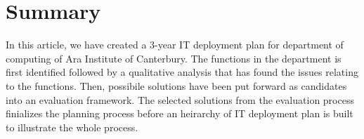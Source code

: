 
\section{Summary}

In this article, we have created a 3-year IT deployment plan for department of computing of Ara Institute of Canterbury. The functions in the department is first identified followed by a qualitative analysis that has found the issues relating to the functions. Then, possibile solutions have been put forward as candidates into an evaluation framework. The selected solutions from the evaluation process finializes the planning process before an heirarchy of IT deployment plan is built to illustrate the whole process.


